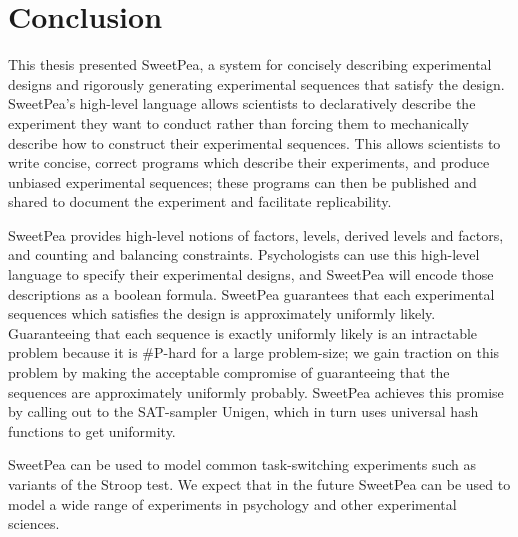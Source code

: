 \chapter{Conclusion}

This thesis presented SweetPea, a system for concisely describing experimental designs and rigorously generating experimental sequences that satisfy the design. SweetPea's high-level language allows scientists to declaratively describe the experiment they want to conduct rather than forcing them to mechanically describe how to construct their experimental sequences. This allows scientists to write concise, correct programs which describe their experiments, and produce unbiased experimental sequences; these programs can then be published and shared to document the experiment and facilitate replicability.

SweetPea provides high-level notions of factors, levels, derived levels and factors, and counting and balancing constraints. Psychologists can use this high-level language to specify their experimental designs, and SweetPea will encode those descriptions as a boolean formula. SweetPea guarantees that each experimental sequences which satisfies the design is approximately uniformly likely. Guaranteeing that each sequence is exactly uniformly likely is an intractable problem because it is \#P-hard for a large problem-size; we gain traction on this problem by making the acceptable compromise of guaranteeing that the sequences are approximately uniformly probably. SweetPea achieves this promise by calling out to the SAT-sampler Unigen, which in turn uses universal hash functions to get uniformity.

SweetPea can be used to model common task-switching experiments such as variants of the Stroop test. We expect that in the future SweetPea can be used to model a wide range of experiments in psychology and other experimental sciences.

